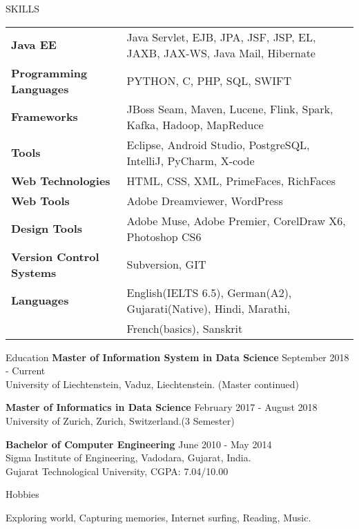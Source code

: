 \documentclass{resume} %
\begin{document}
\begin{rSection}{SKILLS}

\begin{tabular}{ @{} >{\bfseries}l @{\hspace{6ex}} l }
Java EE &  Java Servlet, EJB, JPA, JSF, JSP, EL, JAXB, JAX-WS, Java Mail, Hibernate\\
Programming Languages & PYTHON, C, PHP, SQL, SWIFT\\ 
Frameworks & JBoss Seam, Maven, Lucene, Flink, Spark, Kafka, Hadoop, MapReduce\\
Tools & Eclipse, Android Studio, PostgreSQL, IntelliJ, PyCharm, X-code\\
Web Technologies & HTML, CSS, XML, PrimeFaces, RichFaces\\
Web Tools & Adobe Dreamviewer, WordPress \\
Design Tools & Adobe Muse, Adobe Premier, CorelDraw X6, Photoshop CS6 \\
Version Control Systems & Subversion, GIT\\
Languages & English(IELTS 6.5), German(A2), Gujarati(Native), Hindi, Marathi, \\&French(basics), Sanskrit
\end{tabular}

\end{rSection}
\begin{rSection}{Education}
{\bf Master of Information System in Data Science} \hfill {September 2018 - Current}
\\ 
University of Liechtenstein, Vaduz, Liechtenstein. (Master continued)

{\bf Master of Informatics in Data Science} \hfill {February 2017 - August 2018}
\\ 
University of Zurich, Zurich, Switzerland.(3 Semester)

{\bf Bachelor of Computer Engineering} \hfill {June 2010 - May 2014}
\\ 
Sigma Institute of Engineering, Vadodara, Gujarat, India.
\\
Gujarat Technological University,  CGPA: 7.04/10.00

\end{rSection}

\begin{rSection}{Hobbies} \itemsep -1pt {}   
\item Exploring world, Capturing memories, Internet surfing, Reading, Music.
\end{rSection}
 
\end{document}
